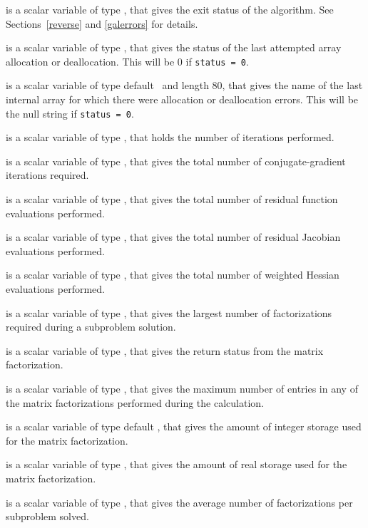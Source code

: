 \documentclass{galahad}
\begin{document}
\begin{description}
 is a scalar variable of type \integer, that gives the
exit status of the algorithm.
See Sections~\ref{reverse} and \ref{galerrors}
for details.

 is a scalar variable of type \integer, that gives
the status of the last attempted array allocation or deallocation.
This will be 0 if {\tt status = 0}.

 is a scalar variable of type default \character\
and length 80, that  gives the name of the last internal array
for which there were allocation or deallocation errors.
This will be the null string if {\tt status = 0}.

 is a scalar variable of type \integer, that holds the
number of iterations performed.

 is a scalar variable of type \integer, that gives the
total number of conjugate-gradient iterations required.

 is a scalar variable of type \integer, that gives the
total number of residual function evaluations performed.

 is a scalar variable of type \integer, that gives the
total number of residual Jacobian evaluations performed.

 is a scalar variable of type \integer, that gives the
total number of weighted Hessian evaluations performed.

 is a scalar variable of type \integer, that
gives the largest number of factorizations required during a subproblem
solution.

 is a scalar variable of type \integer, that
gives the return status from the matrix factorization.

 is a scalar variable of type \longinteger, that
gives the maximum number of entries in any of the matrix factorizations
performed during the calculation.

 is a scalar variable of type default
\integer, that gives the amount of integer storage used for the matrix
factorization.

 is a scalar variable of type \integer,
that gives the amount of real storage used for the matrix factorization.

 is a scalar variable of type \realdp, that
gives the average number of factorizations per subproblem solved.


\end{description}
\end{document}
